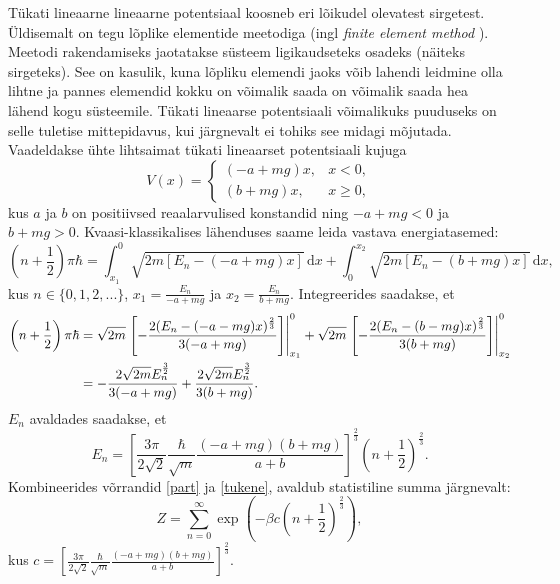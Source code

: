 \documentclass{trkut}%
\begin{document}
Tükati lineaarne lineaarne potentsiaal koosneb eri lõikudel olevatest sirgetest.
Üldisemalt on tegu lõplike elementide meetodiga (ingl \textit{finite element method }).
Meetodi rakendamiseks jaotatakse süsteem ligikaudseteks osadeks (näiteks sirgeteks).
See on kasulik, kuna lõpliku elemendi jaoks võib lahendi leidmine olla lihtne ja pannes elemendid kokku on võimalik saada on võimalik saada hea lähend kogu süsteemile.
Tükati lineaarse potentsiaali võimalikuks puuduseks on selle tuletise mittepidavus, kui järgnevalt ei tohiks see midagi mõjutada.
Vaadeldakse ühte lihtsaimat tükati lineaarset potentsiaali kujuga
\begin{equation} \label{linpot}
    V(x)=\begin{cases}
        (-a+mg)x, & x<0,\\
        (b+mg)x, & x\ge0,
    \end{cases}
\end{equation}
kus $a$ ja $b$ on positiivsed reaalarvulised konstandid ning $-a+mg<0$ ja $b+mg>0$.
Kvaasi-klassikalises lähenduses saame leida vastava energiatasemed:
\begin{equation}
    \left( n+\frac{1}{2}\right)\pi \hbar = \int_{x_1}^{0} \sqrt{2m[E_n-(-a+mg)x]}\, \mathrm{d}x + \int_{0}^{x_2} \sqrt{2m[E_n-(b+mg)x]} \, \mathrm{d}x,
\end{equation}
kus \(n \in \{0, 1, 2, ...\}\), \(x_1=\frac{E_n}{-a+mg}\) ja \(x_2=\frac{E_n}{b+mg}\). Integreerides saadakse, et
\begin{align}
    \left(n+\frac{1}{2}\right)\pi \hbar &= \sqrt{2m}\left.\left[-\frac{2(E_n-(-a-mg)x)^\frac{2}{3}}{3(-a+mg)}\right]\right|^0_{x_1} + \sqrt{2m}\left.\left[-\frac{2(E_n-(b-mg)x)^\frac{2}{3}}{3(b+mg)}\right]\right|^{0}_{x_2} \notag \\
    &= -\frac{2\sqrt{2m}E_n^{\frac{3}{2}}}{3(-a+mg)}+\frac{2\sqrt{2m}E_n^{\frac{3}{2}}}{3(b+mg)}.
\end{align}
$E_n$ avaldades saadakse, et
\begin{equation}
    E_n =\left[\frac{3\pi}{2\sqrt{2}} \frac{\hbar}{\sqrt{m}} \frac{(-a+mg)(b+mg)}{a+b}\right]^{\frac{2}{3}} \left(n+\frac{1}{2}\right)^{\frac{2}{3}} . \label{tukene}
\end{equation}
Kombineerides võrrandid \eqref{part} ja \eqref{tukene}, avaldub statistiline summa järgnevalt:
\begin{equation}
    Z=\sum_{n=0}^{\infty} \exp \left( -\beta c \left(n+\frac{1}{2}\right)^\frac{2}{3} \right),
    \label{linsum}
\end{equation}
kus $c=\left[\frac{3\pi}{2\sqrt{2}} \frac{\hbar}{\sqrt{m}} \frac{(-a+mg)(b+mg)}{a+b}\right]^{\frac{2}{3}}$.
\end{document}
